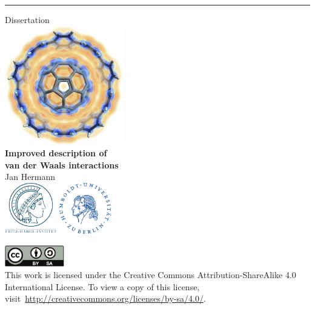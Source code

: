 






\begin{titlepage}
\sffamily\centering
\hrule
\vfill{\Large Dissertation}\\
\vfill\includegraphics[height=14em]{media/10cpp-c60-cloud.png}\\
\vfill{\Huge\bfseries Improved description of\\van der Waals interactions}\\
\vfill{\Large Jan Hermann}\\
\vspace{1em}{\large advised by\\Prof.\ Dr.\ Alexandre Tkatchenko}
\vfill\includegraphics[height=6em]{media/logo-fhi.pdf}
\hfill\includegraphics[height=6em]{media/logo-hu.pdf}
\end{titlepage}
\thispagestyle{empty}
\restoregeometry%

\vspace*{\fill}
\begin{center}
\small
\includegraphics[height=2.5em]{media/by-sa.pdf}\\
\vspace{.5em}
This work is licensed under the Creative Commons Attribution-ShareAlike 4.0 International License.
To view a copy of this license, visit~\url{http://creativecommons.org/licenses/by-sa/4.0/}.
\end{center}

